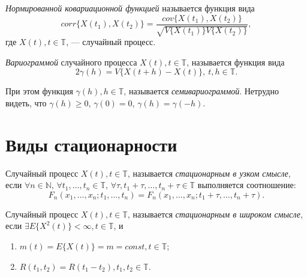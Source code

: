 \begin{Definition}
\label{def:corr_cov}
	\textit{Нормированной ковариационной функцией} называется функция вида
	\begin{equation*}
		corr\{ X(t_1), X(t_2)\} = \frac{cov\{ X(t_1), X(t_2) \}}{\sqrt{ V\{ X(t_1) \} V\{ X(t_2) \} }},
	\end{equation*}
	где $ X(t), t \in \mathbb{T} $, --- случайный процесс.
\end{Definition}

\begin{Definition}
    \textit{Вариограммой} случайного процесса $ X(t), t \in \mathbb{T} $, называется функция вида
	\begin{equation}
	    2 \gamma (h) = V \{ X(t + h) - X(t) \},~ t, h \in \mathbb{T}.
	\end{equation}

	При этом функция $ \gamma (h), h \in \mathbb{T} $, называется \textit{семивариограммой}. Нетрудно видеть, что $ \gamma(h) \ge 0 $, $ \gamma(0) = 0 $, $ \gamma(h) = \gamma(-h) $.
\end{Definition}

\section{Виды стационарности}
\label{sec:variogramAndInnerStationarity}

\begin{Definition}
	Случайный процесс $ X(t), t \in \mathbb{T} $, называется \textit{стационарным в узком смысле}, если $ \forall n \in \mathbb{N} $, $ \forall t_1, \dots, t_n \in \mathbb{T} $, $ \forall \tau, t_1 + \tau, \dots, t_n + \tau \in \mathbb{T} $ выполняется соотношение:
	\begin{equation*}
		F_n(x_1, \dots, x_n; t_1, \dots, t_n) = F_n(x_1, \dots, x_n; t_1 + \tau , \dots, t_n + \tau).
	\end{equation*}
\end{Definition}

\begin{Definition}
\label{def:stat_wide}
	Случайный процесс $ X (t), t \in \mathbb{T} $, называется \textit{стационарным в широком смысле}, если $ \exists E \{ X^2(t) \} < \infty, t \in \mathbb{T} $, и
	\begin{enumerate}
		\item $ m(t) = E \{ X(t) \} = m = const, t \in \mathbb{T} $;
		\item\label{prop:covTimeInvariance} $ R(t_1, t_2) = R(t_1 - t_2), t_1,t_2 \in \mathbb{T} $.
	\end{enumerate}
\end{Definition}

